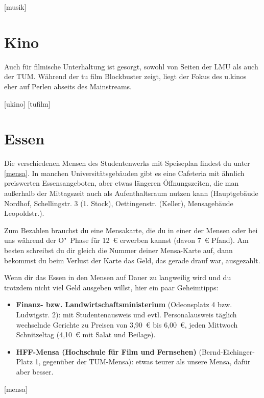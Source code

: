 \begin{urlList}
	[musik]
\end{urlList}

\section{Kino}
Auch für filmische Unterhaltung ist gesorgt, sowohl von Seiten der LMU als auch
der TUM. Während der tu film Blockbuster zeigt, liegt der Fokus des u.kinos
eher auf Perlen abseits des Mainstreams.

\begin{urlList}
	[ukino]
	[tufilm]
\end{urlList}

\section{Essen}
Die verschiedenen Mensen des Studentenwerks mit Speiseplan findest du unter \ref{mensa}. In manchen Universitätsgebäuden gibt es eine Cafeteria mit ähnlich preiswerten Essensangeboten, aber etwas längeren Öffnungszeiten, die man außerhalb der Mittagszeit auch als Aufenthaltsraum nutzen kann (Hauptgebäude Nordhof, Schellingstr. 3 (1. Stock), Oettingenstr. (Keller), Mensagebäude Leopoldstr.).

Zum Bezahlen brauchst du eine Mensakarte, die du in einer der Mensen oder bei uns während der O"~Phase für 12~€ erwerben kannst (davon 7~€ Pfand). Am besten schreibst du dir gleich die Nummer deiner Mensa-Karte auf, dann bekommst du beim Verlust der Karte das Geld, das gerade drauf war, ausgezahlt.

Wenn dir das Essen in den Mensen auf Dauer zu langweilig wird und du trotzdem nicht viel Geld ausgeben willst, hier ein paar Geheimtipps:

\begin{itemize}
	\item \textbf{Finanz- bzw. Landwirtschaftsministerium} (Odeonsplatz 4 bzw. Ludwigstr. 2): mit Studentenausweis und evtl. Personalausweis täglich wechselnde Gerichte zu Preisen von 3,90~€ bis 6,00~€, jeden Mittwoch Schnitzeltag (4,10~€ mit Salat und Beilage).
	
	\item \textbf{HFF-Mensa (Hochschule für Film und Fernsehen)}
          (Bernd-Eichinger-Platz 1, gegenüber der TUM-Mensa): etwas
          teurer als unsere Mensa, dafür aber besser.
\end{itemize}

\begin{urlList}
	[mensa]
\end{urlList}
